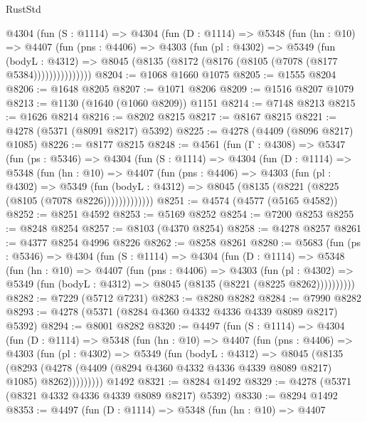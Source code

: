 \begin{lexlean}{RustStd}
\begin{coremodule}
{\begin{coremodule}
{{{{{{{{{{{{{{{{{{{{{{{{{{{{{{{{{{{        @4304
          (fun (S : @1114) =>
          @4304
            (fun (D : @1114) =>
            @5348
              (fun (hn : @10) =>
              @4407
                (fun (pns : @4406) =>
                @4303
                  (fun (pl : @4302) =>
                  @5349
                    (fun (bodyL : @4312) =>
                    @8045 (@8135 (@8172 (@8176 (@8105 (@7078 (@8177 @5384)))))))))))))))
@8204 := @1068 @1660 @1075
@8205 := @1555 @8204
@8206 := @1648 @8205
@8207 := @1071 @8206
@8209 := @1516 @8207 @1079
@8213 := @1130 (@1640 (@1060 @8209)) @1151
@8214 := @7148 @8213
@8215 := @1626 @8214
@8216 := @8202 @8215
@8217 := @8167 @8215
@8221 := @4278 (@5371 (@8091 @8217) @5392)
@8225 := @4278 (@4409 (@8096 @8217) @1085)
@8226 := @8177 @8215
@8248 := @4561
    (fun (Γ : @4308) =>
    @5347
      (fun (ps : @5346) =>
      @4304
        (fun (S : @1114) =>
        @4304
          (fun (D : @1114) =>
          @5348
            (fun (hn : @10) =>
            @4407
              (fun (pns : @4406) =>
              @4303
                (fun (pl : @4302) =>
                @5349
                  (fun (bodyL : @4312) =>
                  @8045 (@8135 (@8221 (@8225 (@8105 (@7078 @8226)))))))))))))
@8251 := @4574 (@4577 (@5165 @4582))
@8252 := @8251 @4592
@8253 := @5169 @8252
@8254 := @7200 @8253
@8255 := @8248 @8254
@8257 := @8103 (@4370 @8254)
@8258 := @4278 @8257
@8261 := @4377 @8254 @4996 @8226
@8262 := @8258 @8261
@8280 := @5683
    (fun (ps : @5346) =>
    @4304
      (fun (S : @1114) =>
      @4304
        (fun (D : @1114) =>
        @5348
          (fun (hn : @10) =>
          @4407
            (fun (pns : @4406) =>
            @4303
              (fun (pl : @4302) =>
              @5349 (fun (bodyL : @4312) => @8045 (@8135 (@8221 (@8225 @8262))))))))))
@8282 := @7229 (@5712 @7231)
@8283 := @8280 @8282
@8284 := @7990 @8282
@8293 := @4278 (@5371 (@8284 @4360 @4332 @4336 @4339 @8089 @8217) @5392)
@8294 := @8001 @8282
@8320 := @4497
    (fun (S : @1114) =>
    @4304
      (fun (D : @1114) =>
      @5348
        (fun (hn : @10) =>
        @4407
          (fun (pns : @4406) =>
          @4303
            (fun (pl : @4302) =>
            @5349
              (fun (bodyL : @4312) =>
              @8045
                (@8135
                  (@8293
                    (@4278 (@4409 (@8294 @4360 @4332 @4336 @4339 @8089 @8217) @1085) @8262)))))))))
    @1492
@8321 := @8284 @1492
@8329 := @4278 (@5371 (@8321 @4332 @4336 @4339 @8089 @8217) @5392)
@8330 := @8294 @1492
@8353 := @4497
    (fun (D : @1114) =>
    @5348
      (fun (hn : @10) =>
      @4407
}}}}}}}}}}}}}}}}}}}}}}}}}}}}}}}}}}}
\end{coremodule}}
\end{coremodule}
\end{lexlean}
